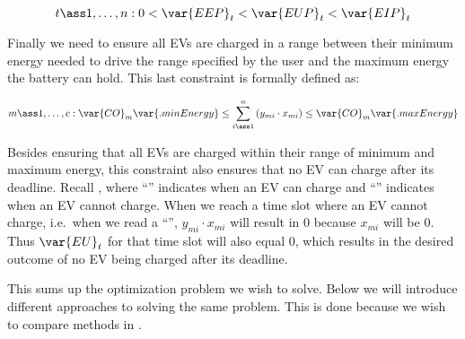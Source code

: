 \[
   t \ass 1, \dots, n : 0 < \var{EEP}_t < \var{EUP}_t < \var{EIP}_t
\]

Finally we need to ensure all EVs are charged in a range between their minimum energy needed to drive the range specified by the user and the maximum energy the battery can hold. This last constraint is formally defined as:

\[
   m \ass 1, \dots, c : \var{CO}_m\var{.minEnergy} \leq \sum_{i \ass 1}^{n} \left( y_{mi} \cdot x_{mi} \right) \leq \var{CO}_m\var{.maxEnergy}
\]

Besides ensuring that all EVs are charged within their range of minimum and maximum energy, this constraint also ensures that no EV can charge after its deadline. Recall , where ``\charge{}'' indicates when an EV can charge and ``\nocharge{}'' indicates when an EV cannot charge. When we reach a time slot where an EV cannot charge, i.e.\ when we read a ``\nocharge{}'', $y_{mi} \cdot x_{mi}$ will result in $0$ because $x_{mi}$ will be $0$. Thus $\var{EU}_t$ for that time slot will also equal $0$, which results in the desired outcome of no EV being charged after its deadline.

This sums up the optimization problem we wish to solve. Below we will introduce different approaches to solving the same problem. This is done because we wish to compare methods in .
